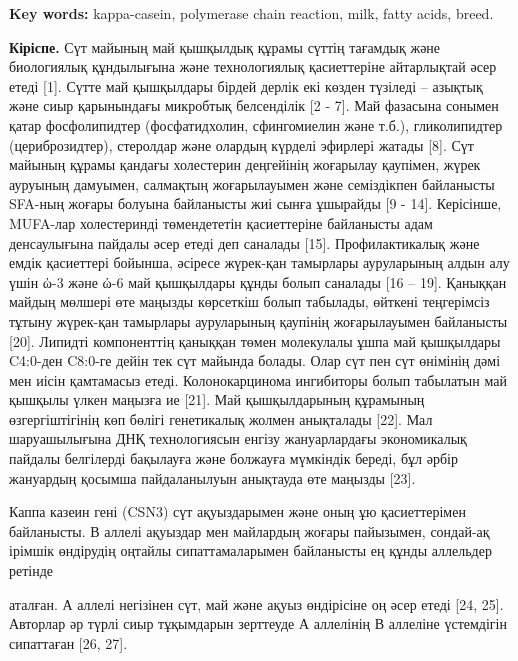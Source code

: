 {\bfseries Key words:} kappa-casein, polymerase chain reaction, milk, fatty
acids, breed.
\begin{multicols}{2}

{\bfseries Кіріспе.} Сүт майының май қышқылдық құрамы сүттің тағамдық және
биологиялық құндылығына және технологиялық қасиеттеріне айтарлықтай әсер
етеді {[}1{]}. Сүтте май қышқылдары бірдей дерлік екі көзден түзіледі --
азықтық және сиыр қарынындағы микробтық белсенділік {[}2 - 7{]}. Май
фазасына сонымен қатар фосфолипидтер (фосфатидхолин, сфингомиелин және
т.б.), гликолипидтер (цериброзидтер), стеролдар және олардың күрделі
эфирлері жатады {[}8{]}. Сүт майының құрамы қандағы холестерин
деңгейінің жоғарылау қаупімен, жүрек ауруының дамуымен, салмақтың
жоғарылауымен және семіздікпен байланысты SFA-ның жоғары болуына
байланысты жиі сынға ұшырайды {[}9 - 14{]}. Керісінше, MUFA-лар
холестеринді төмендететін қасиеттеріне байланысты адам денсаулығына
пайдалы әсер етеді деп саналады {[}15{]}. Профилактикалық және емдік
қасиеттері бойынша, әсіресе жүрек-қан тамырлары ауруларының алдын алу
үшін ὠ-3 және ὠ-6 май қышқылдары құнды болып саналады {[}16 -- 19{]}.
Қаныққан майдың мөлшері өте маңызды көрсеткіш болып табылады, өйткені
теңгерімсіз тұтыну жүрек-қан тамырлары ауруларының қаупінің
жоғарылауымен байланысты {[}20{]}. Липидті компоненттің қаныққан төмен
молекулалы ұшпа май қышқылдары C4:0-ден C8:0-ге дейін тек сүт майында
болады. Олар сүт пен сүт өнімінің дәмі мен иісін қамтамасыз етеді.
Колонокарцинома ингибиторы болып табылатын май қышқылы үлкен маңызға ие
{[}21{]}. Май қышқылдарының құрамының өзгергіштігінің көп бөлігі
генетикалық жолмен анықталады {[}22{]}. Мал шаруашылығына ДНҚ
технологиясын енгізу жануарлардағы экономикалық пайдалы белгілерді
бақылауға және болжауға мүмкіндік береді, бұл әрбір жануардың қосымша
пайдаланылуын анықтауда өте маңызды {[}23{]}.

Каппа казеин гені (CSN3) сүт ақуыздарымен және оның ұю қасиеттерімен
байланысты. В аллелі ақуыздар мен майлардың жоғары пайызымен, сондай-ақ
ірімшік өндірудің оңтайлы сипаттамаларымен байланысты ең құнды аллельдер
ретінде

аталған. А аллелі негізінен сүт, май және ақуыз өндірісіне оң әсер етеді
{[}24, 25{]}. Авторлар әр түрлі сиыр тұқымдарын зерттеуде А аллелінің В
аллеліне үстемдігін сипаттаған {[}26, 27{]}.


\end{multicols}
